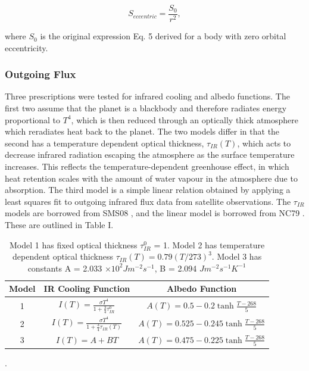 \documentclass[12pt,onecolumn]{revtex4-2}    %
\begin{document}
\begin{equation}
S_{eccentric} = \frac{S_{0}}{r^{2}},
\end{equation}

where $S_{0}$ is the original expression Eq. 5 derived for a body with zero orbital eccentricity.

\subsubsection{Outgoing Flux}

Three prescriptions were tested for infrared cooling and albedo functions. The first two assume that the planet is a blackbody and therefore radiates energy proportional to $T^{4}$, which is then reduced through an optically thick atmosphere which reradiates heat back to the planet. The two models differ in that the second has a temperature dependent optical thickness, $\tau_{IR}(T)$, which acts to decrease infrared radiation escaping the atmosphere as the surface temperature increases. This reflects the temperature-dependent greenhouse effect, in which heat retention scales with the amount of water vapour in the atmosphere due to absorption. The third model is a simple linear relation obtained by applying a least squares fit to outgoing infrared flux data from satellite observations. The $\tau_{IR}$ models are borrowed from SMS08 \cite{SMS08}, and the linear model is borrowed from NC79 \cite{NC79}. These are outlined in Table I. 
\\
\begin{table}
\begin{tabular}{ccc} \toprule
    Model & IR Cooling Function & Albedo Function \\ \midrule
    1  & $I(T) = \frac{\sigma T^{4}}{1+ \frac{3}{4}\tau_{IR}^{0}}$ & $A(T) = 0.5 - 0.2 \tanh \frac{T - 268}{5}$ \\
    2  & $I(T) = \frac{\sigma T^{4}}{1+ \frac{3}{4}\tau_{IR}(T)}$  & $A(T) = 0.525 - 0.245 \tanh \frac{T - 268}{5}$ \\
    3  & $I(T) = A + BT $  & $A(T) = 0.475 - 0.225 \tanh \frac{T - 268}{5}$ \\
\bottomrule
\end{tabular}
\caption{Model 1 has fixed optical thickness $\tau_{IR}^{0}$ = 1. Model 2 has temperature dependent optical thickness $\tau_{IR}(T) = 0.79(T/273)^{3}$. Model 3 has constants A = 2.033 $\times 10^{2} Jm^{-2}s^{-1}$, B = 2.094 $J m^{-2} s^{-1} K^{-1}$}.
\end{table}
\end{document}
